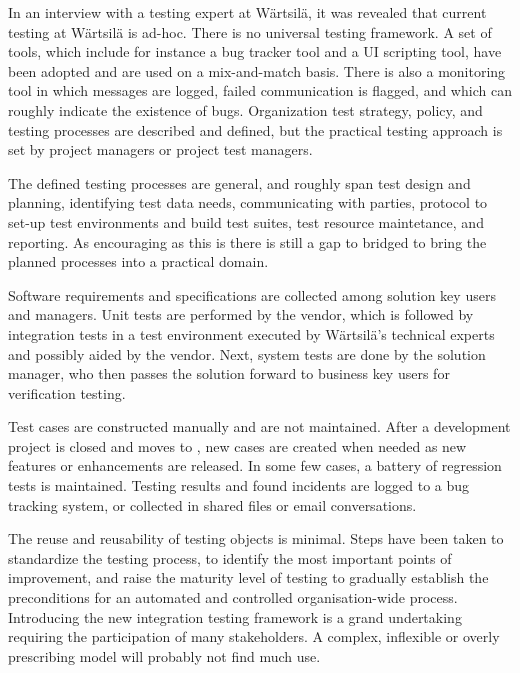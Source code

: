 \documentclass[12pt,a4paper,oneside,pdftex]{report}
\begin{document}
In an interview with a testing expert at Wärtsilä, it was revealed that current testing at Wärtsilä is ad-hoc. There is no universal testing framework. A set of tools, which include for instance a bug tracker tool and a UI scripting tool, have been adopted and are used on a mix-and-match basis. There is also a monitoring tool in which messages are logged, failed communication is flagged, and which can roughly indicate the existence of bugs. Organization test strategy, policy, and testing processes are described and defined, but the practical testing approach is set by project managers or project test managers. 

The defined testing processes are general, and roughly span test design and planning, identifying test data needs, communicating with parties, protocol to set-up test environments and build test suites, test resource maintetance, and reporting. As encouraging as this is there is still a gap to bridged to bring the planned processes into a practical domain. 


Software requirements and specifications are collected among solution key users and managers. Unit tests are performed by the vendor, which is followed by integration tests in a test environment executed by Wärtsilä's technical experts and possibly aided by the vendor. Next, system tests are done by the solution manager, who then passes the solution forward to business key users for verification testing. %

Test cases are constructed manually and are not maintained. After a development project is closed and moves to , new cases are created when needed as new features or enhancements are released. In some few cases, a battery of regression tests is maintained. Testing results and found incidents are logged to a bug tracking system, or collected in shared files or email conversations. 

The reuse and reusability of testing objects is minimal. Steps have been taken to standardize the testing process, to identify the most important points of improvement, and raise the maturity level of testing to gradually establish the preconditions for an automated and controlled organisation-wide process. Introducing the new integration testing framework is a grand undertaking requiring the participation of many stakeholders. A complex, inflexible or overly prescribing model will probably not find much use.
\end{document}
